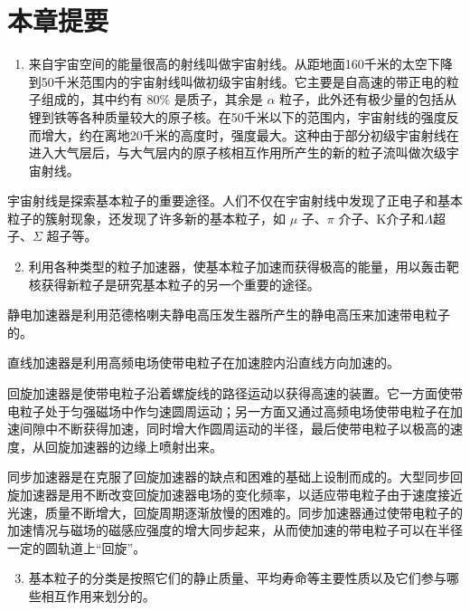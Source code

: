\section{本章提要}

\begin{enumerate}
\item
  来自宇宙空间的能量很高的射线叫做宇宙射线。从距地面160千米的太空下降到50千米范围内的宇宙射线叫做初级宇宙射线。它主要是自高速的带正电的粒子组成的，其中约有
  \(80\%\) 是质子，其余是 \(\alpha\)
  粒子，此外还有极少量的包括从锂到铁等各种质量较大的原子核。在50千米以下的范围内，宇宙射线的强度反而增大，约在离地20千米的高度时，强度最大。这种由于部分初级宇宙射线在进入大气层后，与大气层内的原子核相互作用所产生的新的粒子流叫做次级宇宙射线。
\end{enumerate}

宇宙射线是探索基本粒子的重要途径。人们不仅在宇宙射线中发现了正电子和基本粒子的簇射现象，还发现了许多新的基本粒子，如
\(\mu\) 子、\(\pi\) 介子、K介子和\(\Lambda\)超子、\(\Sigma\) 超子等。

\begin{enumerate}
\setcounter{enumi}{1}
\item
  利用各种类型的粒子加速器，使基本粒子加速而获得极高的能量，用以轰击靶核获得新粒子是研究基本粒子的另一个重要的途径。
\end{enumerate}

静电加速器是利用范德格喇夫静电高压发生器所产生的静电高压来加速带电粒子的。

直线加速器是利用高频电场使带电粒子在加速腔内沿直线方向加速的。

回旋加速器是使带电粒子沿着螺旋线的路径运动以获得高速的装置。它一方面使带电粒子处于匀强磁场中作匀速圆周运动；另一方面又通过高频电场使带电粒子在加速间隙中不断获得加速，同时增大作圆周运动的半径，最后使带电粒子以极高的速度，从回旋加速器的边缘上喷射出来。

同步加速器是在克服了回旋加速器的缺点和困难的基础上设制而成的。大型同步回旋加速器是用不断改变回旋加速器电场的变化频率，以适应带电粒子由于速度接近光速，质量不断增大，回旋周期逐渐放慢的困难的。同步加速器通过使带电粒子的加速情况与磁场的磁感应强度的增大同步起来，从而使加速的带电粒子可以在半径一定的圆轨道上``回旋''。

\begin{enumerate}
\setcounter{enumi}{2}
\item
  基本粒子的分类是按照它们的静止质量、平均寿命等主要性质以及它们参与哪些相互作用来划分的。
\end{enumerate}

